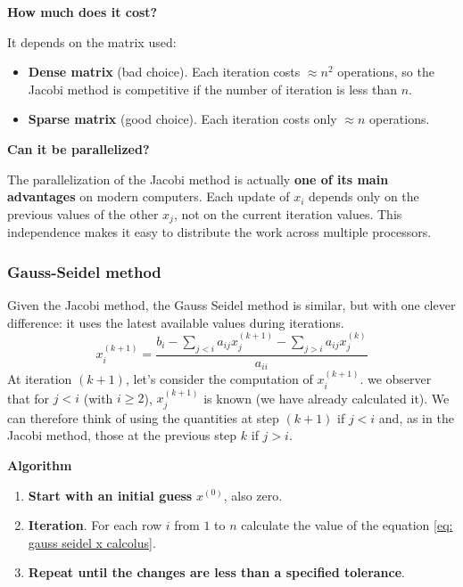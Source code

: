 \highspace
\begin{flushleft}
    \textcolor{Red2}{ \textbf{How much does it cost?}}
    \label{general-ref: cost jacobi method}
\end{flushleft}
It depends on the matrix used:
\begin{itemize}
    \item \textbf{Dense matrix} (bad choice). Each iteration costs $\approx n^{2}$ operations, so the Jacobi method is competitive if the number of iteration is less than $n$.
    \item \textbf{Sparse matrix} (good choice). Each iteration costs only $\approx n$ operations.
\end{itemize}

\highspace
\begin{flushleft}
    \textcolor{Green3}{ \textbf{Can it be parallelized?}}
\end{flushleft}
The parallelization of the Jacobi method is actually \textbf{one of its main advantages} on modern computers. Each update of $x_{i}$ depends only on the previous values of the other $x_{j}$, not on the current iteration values. This independence makes it easy to distribute the work across multiple processors.

\newpage

\subsubsection{Gauss-Seidel method}

Given the Jacobi method, the Gauss Seidel method is similar, but with one clever difference: it uses the latest available values during iterations.
\begin{equation}\label{eq: gauss seidel x calcolus}
    x_{i}^{\left(k+1\right)} = \dfrac{b_{i} - \displaystyle\sum_{j < i} a_{ij}x_{j}^{\left(k+1\right)} - \displaystyle\sum_{j > i}a_{ij}x_{j}^{\left(k\right)}}{a_{ii}}
\end{equation}
At iteration $\left(k+1\right)$, let's consider the computation of $x_{i}^{\left(k+1\right)}$. we observer that for $j < i$ (with $i \ge 2$), $x_{j}^{\left(k+1\right)}$ is known (we have already calculated it). We can therefore think of using the quantities at step $\left(k+1\right)$ if $j<i$ and, as in the Jacobi method, those at the previous step $k$ if $j > i$.

\highspace
\begin{flushleft}
    \textcolor{Green3}{ \textbf{Algorithm}}
\end{flushleft}
\begin{enumerate}
    \item \textbf{Start with an initial guess} $x^{\left(0\right)}$, also zero.
    \item \textbf{Iteration}. For each row $i$ from $1$ to $n$ calculate the value of the equation \ref{eq: gauss seidel x calcolus}.
    \item \textbf{Repeat until the changes are less than a specified tolerance}.
\end{enumerate}

